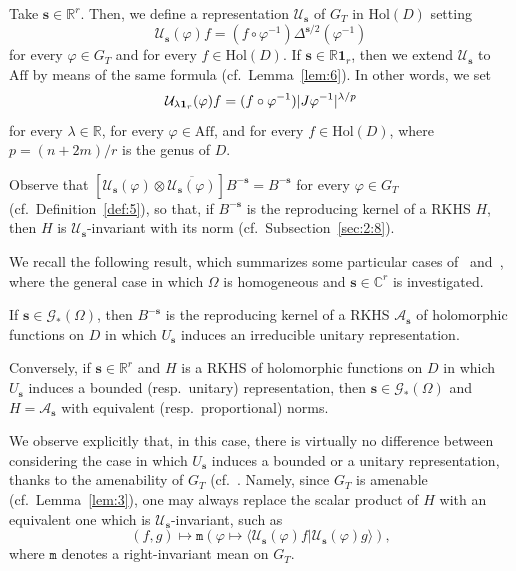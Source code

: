\documentclass[10.5pt,reqno]{amsart}
\newcommand{\Aff}{\mathrm{Aff}}
\newcommand{\Hol}{\mathrm{Hol}}
\newcommand{\vect}[1]{\mathbf{{#1}}}
\DeclarePairedDelimiter{\abs}{\lvert}{\rvert}
\newcommand{\C}{\mathds{C}}
\newcommand{\R}{\mathds{R}}
\newcommand{\Ac}{\mathcal{A}}
\newcommand{\Gc}{\mathcal{G}}
\newcommand{\Uc}{\mathcal{U}}
\renewcommand{\phi}{\varphi}
\begin{document}
\begin{deff}
	Take $\vect s\in \R^r$. Then, we define a representation $\Uc_{\vect s}$ of $G_T$ in $\Hol(D)$ setting
	\[
	\Uc_{\vect s}(\phi) f=(f\circ \phi^{-1}) \Delta^{\vect s/2}(\phi^{-1})
	\]
	for every $\phi\in G_T$ and for every $f\in \Hol(D)$. If $\vect s\in \R \vect 1_r$, then we extend $\Uc_{\vect s}$ to $\Aff$ by means of the same formula  (cf.~Lemma~\ref{lem:6}). In other words, we set 
	\[
	\Uc_{\lambda \vect 1_r}(\phi)f=(f\circ \phi^{-1}) \abs{J \phi^{-1}}^{\lambda/p}
	\]
	for every $\lambda\in \R$, for every $\phi\in \Aff$, and for every $f\in \Hol(D)$, where $p=(n+2m)/r$ is the genus of $D$.
\end{deff}

Observe that $[\Uc_{\vect s}(\phi)\otimes \overline{\Uc_{\vect s}(\phi)}] B^{-\vect s}=B^{-\vect s}$ for every $\phi\in G_T$ (cf.~Definition~\ref{def:5}), so that, if $B^{-\vect s}$ is the reproducing kernel of a RKHS $H$, then $H$ is $\Uc_{\vect s}$-invariant with its norm (cf.~Subsection~\ref{sec:2:8}).

We recall the following result, which summarizes some particular cases of~\cite[Theorem A]{Ishi4} and~\cite[Theorem 6]{Ishi6}, where the general case in which $\Omega$ is homogeneous and $\vect s\in \C^r$ is investigated. 

\begin{prop}\label{prop:4b}
	If $\vect s\in \Gc_*(\Omega)$, then $B^{-\vect s}$ is the reproducing kernel of a RKHS $\Ac_{\vect s}$ of holomorphic functions on $D$ in which $U_{\vect s}$ induces an irreducible unitary representation. 
	
	Conversely, if $\vect s\in \R^r$ and $H$ is a RKHS of holomorphic functions on $D$ in which $U_{\vect s}$ induces a bounded (resp.\ unitary) representation, then $\vect s\in \Gc_*(\Omega)$ and $H=\Ac_{\vect s}$ with equivalent (resp.\ proportional) norms.
\end{prop}

We observe explicitly that, in this case, there is virtually no difference between considering the case in which $U_{\vect s}$ induces a bounded or a unitary representation, thanks to the amenability of $G_T$ (cf.~\cite{Kob1,Kob2,Ku,ArazyFisher2}. Namely, since $G_T$ is amenable (cf.~Lemma~\ref{lem:3}), one may always replace the scalar product of $H$ with an equivalent one which is $\Uc_{\vect s}$-invariant, such as
\[
(f,g)\mapsto \mathtt m(\phi\mapsto \langle \Uc_{\vect s}(\phi)f\vert \Uc_{\vect s}(\phi)g\rangle),
\]
where $\mathtt m$ denotes a right-invariant mean on $G_T$.
\end{document}
